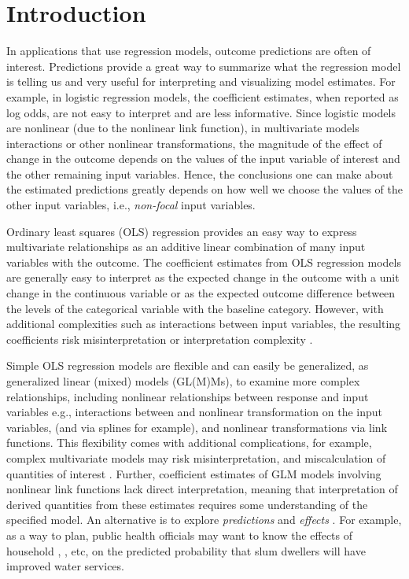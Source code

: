 
\linenumbers

\section{Introduction}


In applications that use regression models, outcome predictions are often of interest. Predictions provide a great way to summarize what the regression model is telling us and very useful for interpreting and visualizing model estimates. For example, in logistic regression models, the coefficient estimates, when reported as log odds, are not easy to interpret and are less informative. Since logistic models are nonlinear (due to the nonlinear link function), in multivariate models interactions or other nonlinear transformations, the magnitude of the effect of change in the outcome depends on the values of the input variable of interest and the other remaining input variables. Hence, the conclusions one can make about the estimated predictions greatly depends on how well we choose the values of the other input variables, i.e., \emph{non-focal} input variables.  

Ordinary least squares (OLS) regression provides an easy way to express multivariate relationships as an additive linear combination of many input variables with the outcome. The coefficient estimates from OLS regression models are generally easy to interpret as the expected change in the outcome with a unit change in the continuous variable or as the expected outcome difference between the levels of the categorical variable with the baseline category. However, with additional complexities such as interactions between input variables, the resulting coefficients risk misinterpretation or interpretation complexity \citep{brambor_understanding_2006, berry_improving_2012}. 

Simple OLS regression models are flexible and can easily be generalized, as generalized linear (mixed) models (GL(M)Ms), to examine more complex relationships, including nonlinear relationships between response and input variables e.g., interactions between and nonlinear transformation on the input variables, (and via splines for example), and nonlinear transformations via link functions. This flexibility comes with additional complications, for example, complex multivariate models may risk misinterpretation, and miscalculation of quantities of interest \citep{berry_improving_2012, leeper2017interpreting}. Further, coefficient estimates of GLM models involving nonlinear link functions lack direct interpretation\citep{leeper2017interpreting}, meaning that interpretation of derived quantities from these estimates requires some understanding of the specified model. An alternative is to explore \emph{predictions} and \emph{effects} \citep{fox2009effect, leeper2017package, lenth2018package}.  For example, as a way to plan, public health officials may want to know the effects of household , , etc, on the predicted probability that slum dwellers will have improved water services. 

